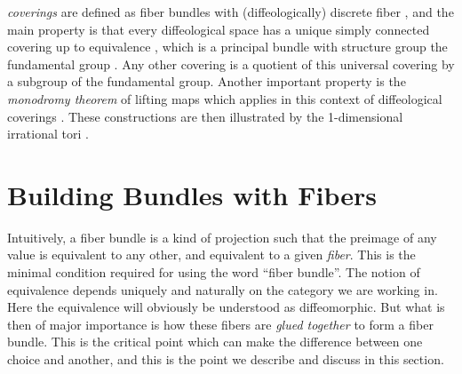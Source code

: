 \begin{chaphead}
  {\em coverings} are defined as fiber bundles with (diffeologically) discrete fiber ,
  and the main property is that every diffeological space has a unique simply connected covering up to equivalence ,
  which is a principal bundle with structure group the fundamental group .
  Any other covering is a quotient of this universal covering by a subgroup of the fundamental group.
  Another important property is the {\em monodromy theorem} of lifting maps which applies in this context of diffeological coverings
  .
  These constructions are then illustrated by the 1-dimensional irrational tori .
\end{chaphead}


\section*{Building Bundles with Fibers}
\label{Building-bundles-with-fibers}

\begin{sechead}
  Intuitively,
  a fiber bundle is a kind of projection such that the preimage of any value is equivalent to any other,
  and equivalent to a given {\em fiber}.
  This is the minimal condition required for using the word ``fiber bundle''.
  The notion of equivalence depends uniquely and naturally on the category we are working in.
  Here the equivalence will obviously be understood  as diffeomorphic.
  But what is then of major importance is how these fibers are {\em glued together} to form a fiber bundle.
  This is the critical point which can make the difference between one choice and another,
  and this is the point we describe and discuss  in this section.
\end{sechead}

